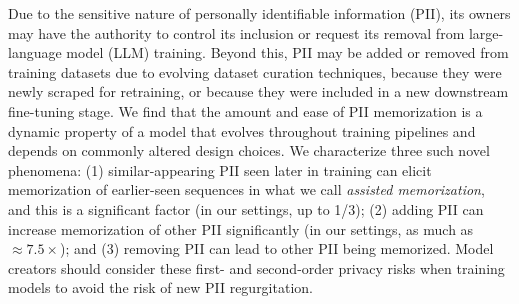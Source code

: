 
Due to the sensitive nature of personally identifiable information (PII), its owners may have the authority to control its inclusion or request its removal from large-language model (LLM) training. 
Beyond this, PII may be added or removed from training datasets due to evolving dataset curation techniques, because they were newly scraped for retraining, or because they were included in a new downstream fine-tuning stage. We find that the amount and ease of PII memorization is a dynamic property of a model that evolves throughout training pipelines and depends on commonly altered design choices. We characterize three such novel phenomena: (1) similar-appearing PII seen later in training can elicit memorization of earlier-seen sequences in what we call \emph{assisted memorization}, and this is a significant factor (in our settings, up to 1/3); (2) adding PII can increase memorization of other PII significantly (in our settings, as much as $\approx\!7.5\times$); and (3) removing PII can lead to other PII being memorized.
Model creators should consider these first- and second-order privacy risks when training models to avoid the risk of new PII regurgitation. 
